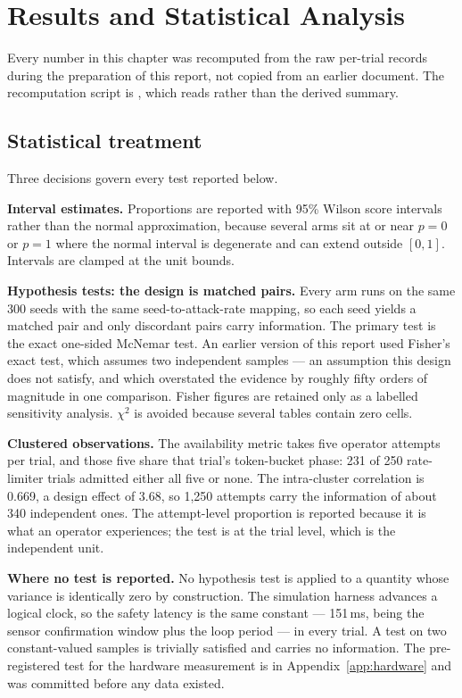 \chapter{Results and Statistical Analysis}\label{ch:results}

Every number in this chapter was recomputed from the raw per-trial records during the
preparation of this report, not copied from an earlier document. The recomputation script is
, which reads  rather than the
derived summary.

\section{Statistical treatment}

Three decisions govern every test reported below.

\textbf{Interval estimates.} Proportions are reported with 95\% Wilson score intervals rather
than the normal approximation, because several arms sit at or near $p=0$ or $p=1$ where the
normal interval is degenerate and can extend outside $[0,1]$. Intervals are clamped at the unit
bounds.

\textbf{Hypothesis tests: the design is matched pairs.} Every arm runs on the same 300 seeds with
the same seed-to-attack-rate mapping, so each seed yields a matched pair and only discordant pairs
carry information. The primary test is the exact one-sided McNemar test. An earlier version of
this report used Fisher's exact test, which assumes two independent samples --- an assumption this
design does not satisfy, and which overstated the evidence by roughly fifty orders of magnitude in
one comparison. Fisher figures are retained only as a labelled sensitivity analysis. $\chi^2$ is
avoided because several tables contain zero cells.

\textbf{Clustered observations.} The availability metric takes five operator attempts per trial,
and those five share that trial's token-bucket phase: 231 of 250 rate-limiter trials admitted
either all five or none. The intra-cluster correlation is 0.669, a design effect of 3.68, so 1,250
attempts carry the information of about 340 independent ones. The attempt-level proportion is
reported because it is what an operator experiences; the test is at the trial level, which is the
independent unit.

\textbf{Where no test is reported.} No hypothesis test is applied to a quantity whose variance
is identically zero by construction. The simulation harness advances a logical clock, so the
safety latency is the same constant — 151\,ms, being the sensor confirmation window plus the
loop period — in every trial. A test on two constant-valued samples is trivially satisfied and
carries no information. The pre-registered test for the hardware measurement is in
Appendix~\ref{app:hardware} and was committed before any data existed.

